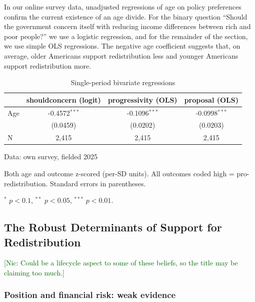 \documentclass[11pt, headsepline]{article}
\newcommand{\nic}[1]{\noindent\textcolor{darkgreen}{[Nic: #1]}}
\begin{document}
In our online survey data, unadjusted regressions of age on policy preferences confirm the current existence of an age divide. For the binary question ``Should the government concern itself with reducing income differences between rich and poor people?'' we use a logistic regression, and for the remainder of the section, we use simple OLS regressions. The negative age coefficient suggests that, on average, older Americans support redistribution less and younger Americans support redistribution more.

\begin{table}[H]
\caption{Single-period bivariate regressions}
\centering
\begin{threeparttable}

\begin{tabular}{lccc}
\toprule
 & shouldconcern (logit) & progressivity (OLS) & proposal (OLS) \\
\midrule
Age & -0.4572$^{***}$ & -0.1096$^{***}$ & -0.0998$^{***}$ \\
    & (0.0459) & (0.0202) & (0.0203) \\
\midrule
N & 2,415 & 2,415 & 2,415 \\
\bottomrule
\end{tabular}
\begin{tablenotes}[flushleft]
\footnotesize
\item Data: own survey, fielded 2025
\item Both age and outcome z-scored (per-SD units). All outcomes coded high =
pro-redistribution. Standard errors in parentheses.
\item $^{*}$ $p<0.1$, $^{**}$ $p<0.05$, $^{***}$ $p<0.01$.
\end{tablenotes}
\end{threeparttable}
\end{table}

\subsection{The Robust Determinants of Support for Redistribution}


\nic{Could be a lifecycle aspect to some of these beliefs, so the title may be claiming too much.}

\subsubsection{Position and financial risk: weak evidence}

\end{document}
